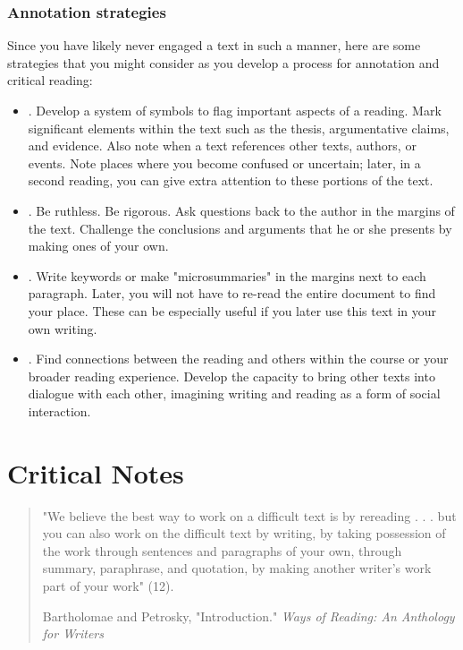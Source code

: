 \subsection{Annotation strategies}

Since you have likely never engaged a text in such a manner, here are some
strategies that you might consider as you develop a process for annotation and
critical reading:

\begin{itemize} \item {}. Develop a system of symbols
to flag important aspects of a reading. Mark significant elements within the
text such as the thesis, argumentative claims, and evidence. Also note when a
text references other texts, authors, or events. Note places where you become
confused or uncertain; later, in a second reading, you can give extra attention
to these portions of the text.

\item {}. Be ruthless. Be rigorous. Ask questions
back to the author in the margins of the text. Challenge the conclusions and
arguments that he or she presents by making ones of your own.

\item {}. Write keywords or make "microsummaries" in the margins
next to each paragraph. Later, you will not have to re-read the entire document
to find your place. These can be especially useful if you later use this text in
your own writing.

\item {}. Find connections between the reading and others within
the course or your broader reading experience. Develop the capacity to bring
other texts into dialogue with each other, imagining writing and reading as a
form of social interaction. \end{itemize}



\chapter{Critical Notes}
\hypertarget{notes}{}

\begin{quote} \small "We believe the best way to work on a difficult text is by
rereading . . . but you can also work on the difficult text by writing, by taking
possession of the work through sentences and paragraphs of your own, through
summary, paraphrase, and quotation, by making another writer’s work part of your
work" (12).

\textemdash Bartholomae and Petrosky, "Introduction." \emph{Ways of Reading: An
Anthology for Writers}

\end{quote}

